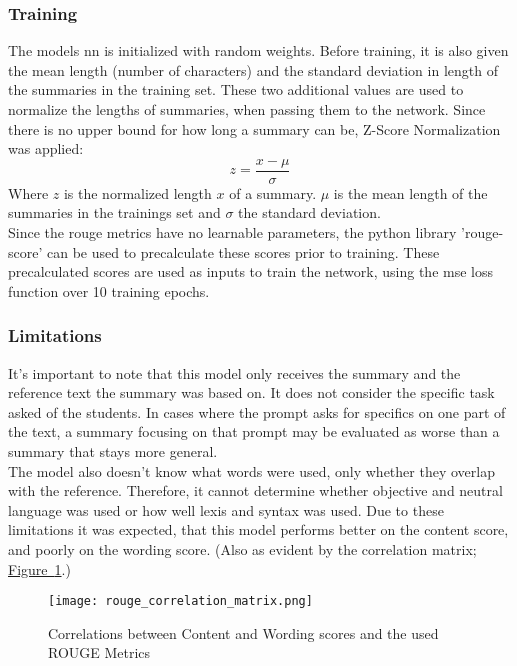 \subsubsection{Training}
The models \gls{nn} is initialized with random weights. Before training, it is also given the mean length (number of characters) and the standard deviation in length of the summaries in the training set. These two additional values are used to normalize the lengths of summaries, when passing them to the network. Since there is no upper bound for how long a summary can be, Z-Score Normalization was applied: %
\begin{equation}\label{eq:z-score}
    z=\frac{x-\mu}{\sigma}
\end{equation}
Where $z$ is the normalized length $x$ of a summary. $\mu$ is the mean length of the summaries in the trainings set and $\sigma$ the standard deviation.\\
Since the \gls{rouge} metrics have no learnable parameters, the python library 'rouge-score' can be used to precalculate these scores prior to training.
These precalculated scores are used as inputs to train the network, using the \gls{mse} loss function over 10 training \glspl{epoch}.

\subsubsection{Limitations}
It's important to note that this model only receives the summary and the reference text the summary was based on. It does not consider the specific task asked of the students. In cases where the prompt asks for specifics on one part of the text, a summary focusing on that prompt may be evaluated as worse than a summary that stays more general.\\
The model also doesn't know what words were used, only whether they overlap with the reference. Therefore, it cannot determine whether objective and neutral language was used or how well lexis and syntax was used. Due to these limitations it was expected, that this model performs better on the content score, and poorly on the wording score. (Also as evident by the correlation matrix; \hyperref[fig:rouge-correlation-matrix]{Figure~\ref{fig:rouge-correlation-matrix}}.)

\begin{figure}[h]
\texttt{[image: rouge\_correlation\_matrix.png]}
\caption[ROUGE Metrics Correlation Matrix]{Correlations between Content and Wording scores and the used ROUGE Metrics}
\label{fig:rouge-correlation-matrix}
\end{figure}
